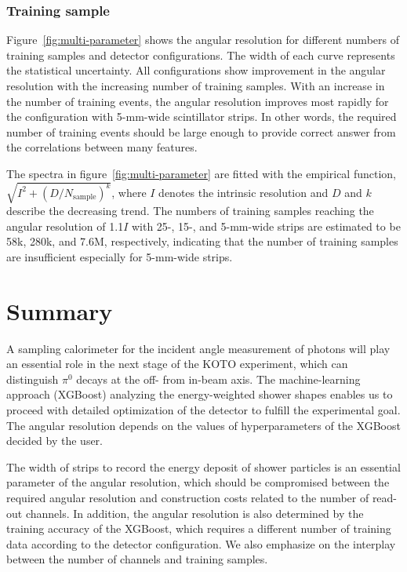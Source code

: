 \documentclass[12pt,times,draftclsnofoot,a4paper]{elsarticle}
\begin{document}
\subsubsection{Training sample}
Figure~\ref{fig:multi-parameter} shows the angular resolution for different numbers of training samples and detector configurations. The width of each curve represents the statistical uncertainty. All configurations show improvement in the angular resolution with the increasing number of training samples. With an increase in the number of training events, the angular resolution improves most rapidly for the configuration with 5-mm-wide scintillator strips. In other words, the required number of training events should be large enough to provide correct answer from the correlations between many features.

The spectra in figure~\ref{fig:multi-parameter} are fitted with the empirical function, $\sqrt{I^{2} + (D/N_{\mathrm{sample}})^{k}}$, where $I$ denotes the intrinsic resolution and $D$ and $k$ describe the decreasing trend. The numbers of training samples reaching the angular resolution of 1.1$I$ with 25-, 15-, and 5-mm-wide strips are estimated to be 58k, 280k, and 7.6M, respectively, indicating that the number of training samples are insufficient especially for 5-mm-wide strips.

\section{Summary}
\label{sec:sum}

A sampling calorimeter for the incident angle measurement of photons will play an essential role in the next stage of the KOTO experiment, which can distinguish $\pi^0$ decays at the off- from in-beam axis. The machine-learning approach (XGBoost) analyzing the energy-weighted shower shapes enables us to proceed with detailed optimization of the detector to fulfill the experimental goal. The angular resolution depends on the values of hyperparameters of the XGBoost decided by the user.

The width of strips to record the energy deposit of shower particles is an essential parameter of the angular resolution, which should be compromised between the required angular resolution and construction costs related to the number of read-out channels. In addition, the angular resolution is also determined by the training accuracy of the XGBoost, which requires a different number of training data according to the detector configuration. We also emphasize on the interplay between the number of channels and training samples.
\end{document}
